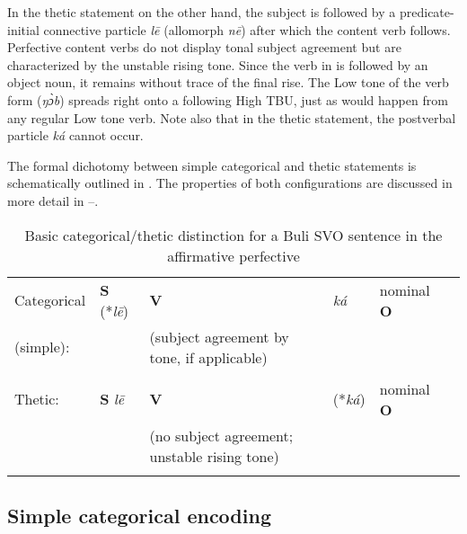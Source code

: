\documentclass[output=paper]{langsci/langscibook}
\begin{document}
In the thetic statement on the other hand, the subject is followed by a predicate-initial connective particle \textit{l}\textit{\={e}} (allomorph \textit{n\={e}}) after which the content verb follows. Perfective content verbs do not display tonal subject agreement but are characterized by the unstable rising tone. Since the verb in  is followed by an object noun, it remains without trace of the final rise. The Low tone of the verb form (\textit{ŋ\`{ɔ}b}) spreads right onto a following High TBU, just as would happen from any regular Low tone verb. Note also that in the thetic statement, the postverbal particle \textit{ká} cannot occur.

  The formal dichotomy between simple categorical and thetic statements is schematically outlined in . The properties of both configurations are discussed in more detail in --.
 
\begin{table}
\caption{Basic categorical/thetic distinction for a Buli SVO sentence in the affirmative perfective}
\label{tab:2}

\begin{tabularx}{\textwidth}{XXXXXX}
\lsptoprule

{Categorical} & {\textbf{S}} {(*\textit{l\={e}})} & {\textbf{V} } & {\textit{ká}} & {nominal \textbf{O}}\\
{(simple):} & & {(subject agreement by tone, if applicable)} & { }\\
& & {}
\\
{Thetic:} & {\textbf{S}} {\textit{l\={e}}} & {\textbf{V} } & {(*\textit{ká})} & {nominal \textbf{O}}\\
& & {(no subject agreement; unstable rising tone)} \\

\lspbottomrule
\end{tabularx}

\end{table} 

\subsection{Simple categorical encoding}\label{sec:schwarz:3.2}
\end{document}
